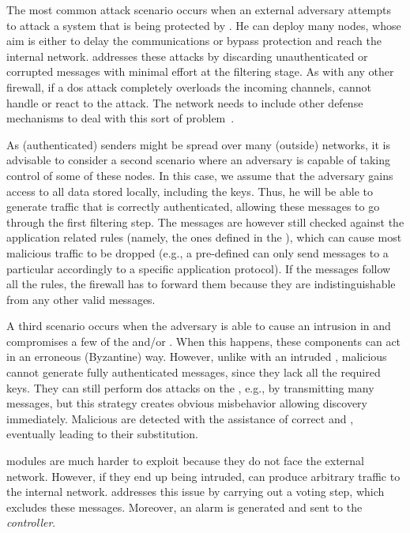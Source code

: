 The most common attack scenario occurs when an external adversary attempts to attack a system that is being protected by \sieveq. 
He can deploy many nodes, whose aim is either to delay the communications or bypass \sieveq protection and reach the internal network. 
\sieveq addresses these attacks by discarding unauthenticated or corrupted messages with minimal effort at the \presieve filtering stage.
As with any other firewall, if a \gls{dos} attack completely overloads the incoming channels, \sieveq cannot handle or react to the attack.
The network needs to include other defense mechanisms to deal with this sort of problem~\cite{Mishra:2011}.

As (authenticated) senders might be spread over many (outside) networks, it is advisable to consider a second scenario where an adversary is capable of taking control of some of these nodes. 
In this case, we assume that the adversary gains access to all data stored locally, including the \sender keys. 
Thus, he will be able to generate traffic that is correctly authenticated, allowing these messages to go through the first filtering step.
The messages are however still checked against the application related rules (namely, the ones defined in the \repsieve), which can cause most malicious traffic to be dropped (e.g., a pre-defined \sender can only send messages to a particular \postsieve accordingly to a specific application protocol).
If the messages follow all the rules, the firewall has to forward them because they are indistinguishable from any other valid messages.

A third scenario occurs when the adversary is able to cause an intrusion in \sieveq and compromises a few of the \presieves and/or \repsieves. 
When this happens, these components can act in an erroneous (Byzantine) way. 
However, unlike with an intruded \sender, malicious \presieves cannot generate fully authenticated messages, since they lack all the required keys. 
They can still perform \gls{dos} attacks on the \repsieves, e.g., by transmitting many messages, but this strategy creates obvious misbehavior allowing discovery immediately. 
Malicious \presieves are detected with the assistance of correct \sender and \repsieves, eventually leading to their substitution.

\Repsieves modules are much harder to exploit because they do not face the external network. However, if they end up being intruded, \repsieves can produce arbitrary traffic to the internal network. \Postsieve addresses this issue by carrying out a voting step, which excludes these messages. Moreover, an alarm is generated and sent to the \emph{controller}.

